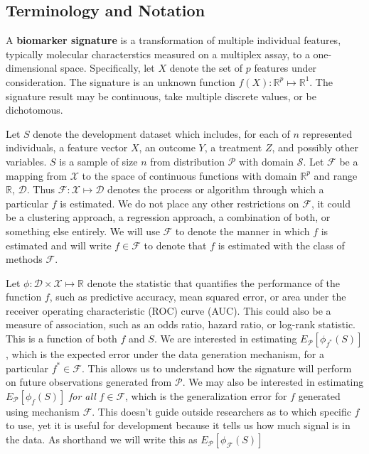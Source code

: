 \documentclass[12pt,]{article}
\begin{document}
\subsection{Terminology and Notation}\label{terminology-and-notation}

A \textbf{biomarker signature} is a transformation of multiple
individual features, typically molecular characterstics measured on a
multiplex assay, to a one-dimensional space. Specifically, let \(X\)
denote the set of \(p\) features under consideration. The signature is
an unknown function \(f(X): \mathbb{R}^p \mapsto \mathbb{R}^1\). The
signature result may be continuous, take multiple discrete values, or be
dichotomous.

Let \(S\) denote the development dataset which includes, for each of
\(n\) represented individuals, a feature vector \(X\), an outcome \(Y\),
a treatment \(Z\), and possibly other variables. \(S\) is a sample of
size \(n\) from distribution \(\mathcal{P}\) with domain
\(\mathcal{S}\). Let \(\mathcal{F}\) be a mapping from \(\mathcal{X}\)
to the space of continuous functions with domain \(\mathbb{R}^p\) and
range \(\mathbb{R}\), \(\mathcal{D}\). Thus
\(\mathcal{F}: \mathcal{X} \mapsto \mathcal{D}\) denotes the process or
algorithm through which a particular \(f\) is estimated. We do not place
any other restrictions on \(\mathcal{F}\), it could be a clustering
approach, a regression approach, a combination of both, or something
else entirely. We will use \(\mathcal{F}\) to denote the manner in which
\(f\) is estimated and will write \(f \in \mathcal{F}\) to denote that
\(f\) is estimated with the class of methods \(\mathcal{F}\).

Let \(\phi: \mathcal{D} \times \mathcal{X} \mapsto \mathbb{R}\) denote
the statistic that quantifies the performance of the function \(f\),
such as predictive accuracy, mean squared error, or area under the
receiver operating characteristic (ROC) curve (AUC). This could also be
a measure of association, such as an odds ratio, hazard ratio, or
log-rank statistic. This is a function of both \(f\) and \(S\). We are
interested in estimating \(E_\mathcal{P}[\phi_{f^*}(S)]\), which is the
expected error under the data generation mechanism, for a particular
\(f^* \in \mathcal{F}\). This allows us to understand how the signature
will perform on future observations generated from \(\mathcal{P}\). We
may also be interested in estimating \(E_\mathcal{P}[\phi_f(S)]\)
\emph{for all} \(f \in \mathcal{F}\), which is the generalization error
for \(f\) generated using mechanism \(\mathcal{F}\). This doesn't guide
outside researchers as to which specific \(f\) to use, yet it is useful
for development because it tells us how much signal is in the data. As
shorthand we will write this as \(E_\mathcal{P}[\phi_\mathcal{F}(S)]\)
\end{document}
